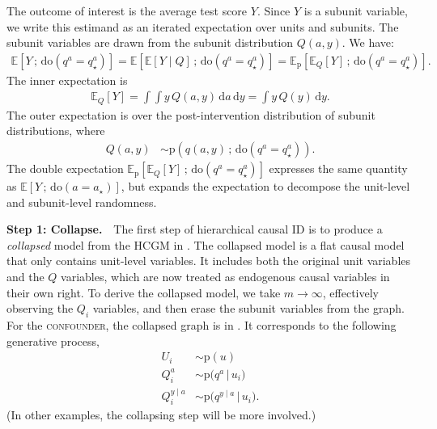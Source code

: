 \documentclass[12pt]{article}
\newcommand{\E}[1]{\mathbb{E}\left[ #1 \right]}
\newcommand{\EE}[2]{\mathbb{E}_{#1}\left[ #2 \right]}
\newcommand{\rmdo}{\mathrm{do}}
\newcommand{\s}{\, ; \,}
\newcommand{\di}{\mathrm{d}}
\newcommand{\pr}{\mathrm{p}}
\newcommand{\parheadsmall}[1]{\vspace{0.1in} \noindent \textbf{#1} \,\,}
\begin{document}
The outcome of interest is the average test score $Y$. Since $Y$ is a
subunit variable, we write this estimand as an iterated expectation over units and subunits. The subunit variables are drawn from the
subunit distribution $Q(a,y)$. We have:
\begin{align}
  \label{eq:confounder_estimand}
  \mathbb{E}[Y \s \rmdo(q^a=q^a_\star)] = \mathbb{E}[\mathbb{E}[Y\mid Q] \s \rmdo(q^a=q^a_\star)] =  \EE{\pr}{\EE{Q}{Y} \s \rmdo(q^a = q^{a}_\star)}.
\end{align}
The inner expectation is
\begin{align*}
  \EE{Q}{Y} = \int \int y\, Q(a, y) \, \di a\, \di y = \int y\, Q(y)\, \di y.
\end{align*}
The outer expectation is over the post-intervention distribution of
subunit distributions, where
\begin{align*}
  Q(a, y) &\sim \pr(q(a, y) \s \rmdo(q^a = q^{a}_\star)).
\end{align*}
The double expectation $\EE{\pr}{\EE{Q}{Y} \s \rmdo(q^a = q^{a}_\star)}$ expresses the same quantity as
$\E{Y \s \rmdo(a=a_\star)}$, but expands the expectation to
decompose the unit-level and subunit-level randomness.

















\parheadsmall{Step 1: Collapse.} The first step of hierarchical causal ID is to produce a
\textit{collapsed} model from the HCGM in
. The collapsed model is a flat causal model
that only contains unit-level variables. It includes both the original
unit variables and the $Q$ variables, which are now treated as
endogenous causal variables in their own right.  To derive the
collapsed model, we take $m \rightarrow \infty$, effectively observing
the $Q_i$ variables, and then erase the subunit variables from the
graph.  For the \textsc{confounder}, the collapsed graph is in
. It corresponds to the following generative
process,
\begin{equation} \label{eqn:confounder_collapse}
\begin{split}
  U_i &\sim \pr(u)\\
  Q^{a}_i &\sim \pr\big(q^{a} \, \big|\, u_i \big)\\
  Q^{y \mid a}_i &\sim \pr\big(q^{y \mid a}\, \big|\, u_i\big).
\end{split}
\end{equation}
(In other examples, the collapsing step will be more involved.)
\end{document}
